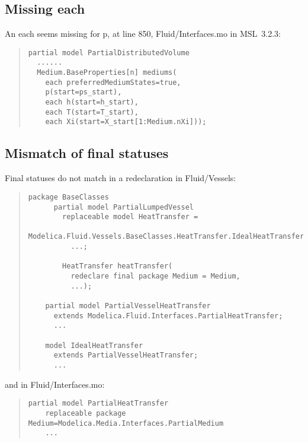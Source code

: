 \documentclass[10pt,b5paper]{article}
\begin{document}
\subsection{Missing each}

An each seems missing for p, at line 850, Fluid/Interfaces.mo in
MSL~3.2.3:
\begin{quote}
\begin{lstlisting}[aboveskip=-\baselineskip]
partial model PartialDistributedVolume
  ......
  Medium.BaseProperties[n] mediums(
    each preferredMediumStates=true,
    p(start=ps_start),
    each h(start=h_start),
    each T(start=T_start),
    each Xi(start=X_start[1:Medium.nXi]));
\end{lstlisting}
\end{quote}

\subsection{Mismatch of final statuses}

Final statuses do not match in a redeclaration in Fluid/Vessels:
\begin{quote}
\begin{lstlisting}[aboveskip=-\baselineskip]
  package BaseClasses
      partial model PartialLumpedVessel
        replaceable model HeatTransfer =
            Modelica.Fluid.Vessels.BaseClasses.HeatTransfer.IdealHeatTransfer
          ...;

        HeatTransfer heatTransfer(
          redeclare final package Medium = Medium,
          ...);

    partial model PartialVesselHeatTransfer
      extends Modelica.Fluid.Interfaces.PartialHeatTransfer;
      ...

    model IdealHeatTransfer
      extends PartialVesselHeatTransfer;
      ...
\end{lstlisting}
\end{quote}
and in Fluid/Interfaces.mo:
\begin{quote}
\begin{lstlisting}[aboveskip=-\baselineskip]
  partial model PartialHeatTransfer
    replaceable package Medium=Modelica.Media.Interfaces.PartialMedium
    ...
\end{lstlisting}
\end{quote}




\end{document}
